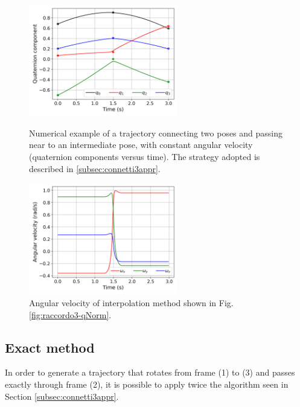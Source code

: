 \begin{figure}[tbp]
    \begin{minipage}[t]{0.49\textwidth}
        \centering
        \includegraphics[width=6.5cm]{figures/legnani_constvel_compo.png}
        \caption{Numerical example of a trajectory connecting two poses and passing near to an intermediate pose, with constant angular velocity (quaternion components versus time). The strategy adopted is described in \ref{subsec:connetti3appr}.}
        \label{fig:raccordo3-qNorm}
    \end{minipage}
    \hfill
    \begin{minipage}[t]{0.49\textwidth}
        \centering
        \includegraphics[width=6.5cm]{figures/legnani_constvel_vel.png}
        \caption{Angular velocity of interpolation method shown in Fig. \ref{fig:raccordo3-qNorm}.}
        \label{fig:raccordo3-wNorm}
    \end{minipage}
\end{figure}


\subsection{Exact method}
\label{subsec:connetti3esatto}
In order to generate a trajectory that rotates from frame (1) to (3) and passes exactly through frame (2), it is possible to apply twice the algorithm  seen in Section \ref{subsec:connetti3appr}.

